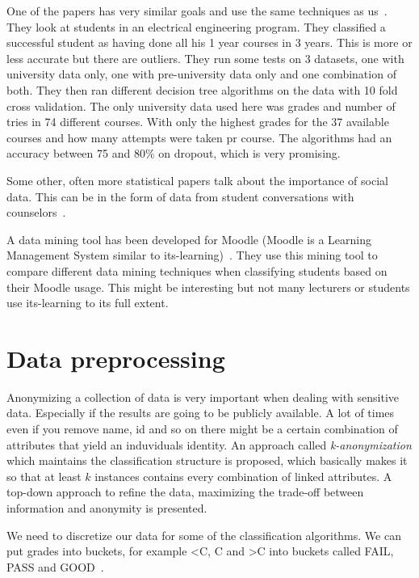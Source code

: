\bigskip\noindent
One of the papers has very similar goals and use the same techniques as us~\cite{7}.
They look at students in an electrical engineering program. 
They classified a successful student as having done all his 1 year courses in 3 years. 
This is more or less accurate but there are outliers. 
They run some tests on 3 datasets, one with university data only, one with pre-university data only and one combination of both. 
They then ran different decision tree algorithms on the data with 10 fold cross validation. 
The only university data used here was grades and number of tries in 74 different courses. 
With only the highest grades for the 37 available courses and how many attempts were taken pr course.
The algorithms had an accuracy between 75 and 80\% on dropout, which is very promising.

\bigskip\noindent
Some other, often more statistical papers talk about the importance of social data. 
This can be in the form of data from student conversations with counselors~\cite{11}.

\bigskip\noindent
A data mining tool has been developed for Moodle (Moodle is a Learning Management System similar to its-learning)~\cite{12}.
They use this mining tool to compare different data mining techniques when classifying students based on their Moodle usage. 
This might be interesting but not many lecturers or students use its-learning to its full extent. 

\section{Data preprocessing}
Anonymizing a collection of data is very important when dealing with sensitive data. 
Especially if the results are going to be publicly available. 
A lot of times even if you remove name, id and so on there might be a certain combination of attributes that yield an induviduals identity.
An approach called \textit{k-anonymization} which maintains the classification structure is proposed, 
which basically makes it so that at least $k$ instances contains every combination of linked attributes. 
A top-down approach to refine the data, maximizing the trade-off between information and anonymity is presented.~\cite{14}

\bigskip\noindent
We need to discretize our data for some of the classification algorithms.
We can put grades into buckets, for example \textless C, C and \textgreater C into buckets called FAIL, PASS and GOOD~\cite{12}.

